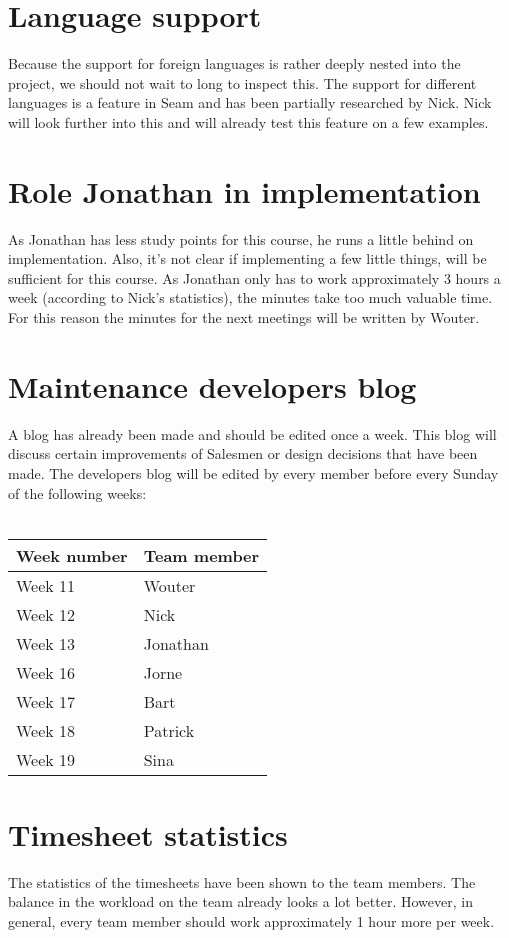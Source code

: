 \documentclass[a4paper, 12pt]{article}
\begin{document}
	\section{Language support}
Because the support for foreign languages is rather deeply nested into the project, we should not wait to long to inspect this. The support for different languages is a feature in Seam and has been partially researched by Nick. Nick will look further into this and will already test this feature on a few examples.
	\section{Role Jonathan in implementation}
As Jonathan has less study points for this course, he runs a little behind on implementation. Also, it's not clear if implementing a few little things, will be sufficient for this course. As Jonathan only has to work approximately 3 hours a week (according to Nick's statistics), the minutes take too much valuable time. For this reason the minutes for the next meetings will be written by Wouter.
	\section{Maintenance developers blog}
A blog has already been made and should be edited once a week. This blog will discuss certain improvements of Salesmen or design decisions that have been made.
The developers blog will be edited by every member before every Sunday of the following weeks:\\ \\
			\begin{tabular}{l | l }
				\textbf{Week number} & \textbf{Team member} \\
				\hline
				Week 11 &  Wouter\\
				\hline
				Week 12 &  Nick\\
				\hline
				Week 13 &  Jonathan\\
				\hline
				Week 16 &  Jorne\\
				\hline
				Week 17 &  Bart\\
				\hline
				Week 18 &  Patrick\\
				\hline
				Week 19 &  Sina\\
			\end{tabular}
	\section{Timesheet statistics}
The statistics of the timesheets have been shown to the team members. The balance in the workload on the team already looks a lot better. However, in general, every team member should work approximately 1 hour more per week.
\end{document}

